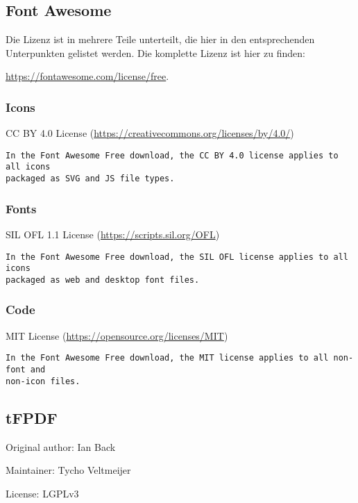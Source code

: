 \documentclass[ngerman]{ltxdoc}
\begin{document}
\subsection{Font Awesome}

Die Lizenz ist in mehrere Teile unterteilt, die hier in den entsprechenden Unterpunkten
gelistet werden. Die komplette Lizenz ist hier zu finden:

\url{https://fontawesome.com/license/free}.

\subsubsection*{Icons}
CC BY 4.0 License (\url{https://creativecommons.org/licenses/by/4.0/})

\begin{lstlisting}[style=license]
In the Font Awesome Free download, the CC BY 4.0 license applies to all icons
packaged as SVG and JS file types.
\end{lstlisting}

\subsubsection*{Fonts}
SIL OFL 1.1 License (\url{https://scripts.sil.org/OFL})

\begin{lstlisting}[style=license]
In the Font Awesome Free download, the SIL OFL license applies to all icons
packaged as web and desktop font files.
\end{lstlisting}

\subsubsection*{Code}
MIT License (\url{https://opensource.org/licenses/MIT})

\begin{lstlisting}[style=license]
In the Font Awesome Free download, the MIT license applies to all non-font and
non-icon files.
\end{lstlisting}

\subsection{tFPDF}

Original author: Ian Back

Maintainer: Tycho Veltmeijer

License: LGPLv3
\end{document}
